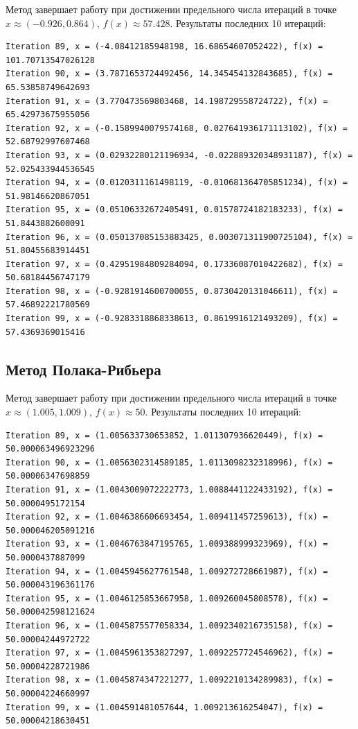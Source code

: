 \documentclass[a4paper, 14pt]{extarticle}
\begin{document}
Метод завершает работу при достижении предельного числа итераций в точке $x \approx (-0.926, 0.864)$, $f(x) \approx 57.428$.
Результаты последних 10 итераций:
\begin{small}
\begin{Verbatim}
Iteration 89, x = (-4.08412185948198, 16.68654607052422), f(x) = 101.70713547026128
Iteration 90, x = (3.7871653724492456, 14.345454132843685), f(x) = 65.53858749642693
Iteration 91, x = (3.770473569803468, 14.198729558724722), f(x) = 65.42973675955056
Iteration 92, x = (-0.1589940079574168, 0.027641936171113102), f(x) = 52.68792997607468
Iteration 93, x = (0.02932280121196934, -0.022889320348931187), f(x) = 52.025433944536545
Iteration 94, x = (0.0120311161498119, -0.010681364705851234), f(x) = 51.98146620867051
Iteration 95, x = (0.05106332672405491, 0.01578724182183233), f(x) = 51.8443882600091
Iteration 96, x = (0.050137085153883425, 0.003071311900725104), f(x) = 51.80455683914451
Iteration 97, x = (0.42951984809284094, 0.17336087010422682), f(x) = 50.68184456747179
Iteration 98, x = (-0.9281914600700055, 0.8730420131046611), f(x) = 57.46892221780569
Iteration 99, x = (-0.9283318868338613, 0.8619916121493209), f(x) = 57.4369369015416
\end{Verbatim}
\end{small}

\subsection{Метод Полака-Рибьера}

Метод завершает работу при достижении предельного числа итераций в точке $x \approx (1.005, 1.009)$, $f(x) \approx 50$.
Результаты последних 10 итераций:
\begin{small}
\begin{Verbatim}
Iteration 89, x = (1.005633730653852, 1.011307936620449), f(x) = 50.000063496923296
Iteration 90, x = (1.0056302314589185, 1.0113098232318996), f(x) = 50.00006347698859
Iteration 91, x = (1.0043009072222773, 1.0088441122433192), f(x) = 50.0000495172154
Iteration 92, x = (1.0046386606693454, 1.009411457259613), f(x) = 50.000046205091216
Iteration 93, x = (1.0046763847195765, 1.009388999323969), f(x) = 50.0000437887099
Iteration 94, x = (1.0045945627761548, 1.009272728661987), f(x) = 50.000043196361176
Iteration 95, x = (1.0046125853667958, 1.009260045808578), f(x) = 50.000042598121624
Iteration 96, x = (1.0045875577058334, 1.0092340216735158), f(x) = 50.00004244972722
Iteration 97, x = (1.0045961353827297, 1.0092257724546962), f(x) = 50.00004228721986
Iteration 98, x = (1.0045874347221277, 1.0092210134289983), f(x) = 50.00004224660997
Iteration 99, x = (1.004591481057644, 1.009213616254047), f(x) = 50.00004218630451
\end{Verbatim}
\end{small}
\end{document}
